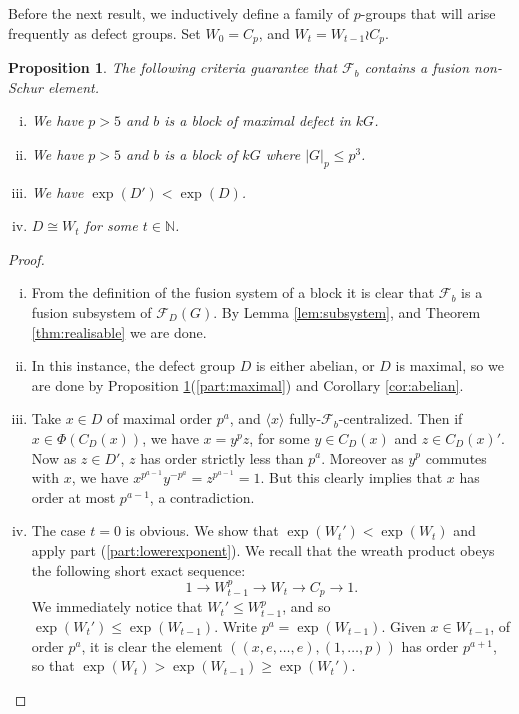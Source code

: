 \documentclass{amsart}
\theoremstyle{plain}\newtheorem{theorem}{Theorem}[section]
\theoremstyle{plain}\newtheorem{conjecture}[theorem]{Conjecture}
\theoremstyle{plain}\newtheorem{corollary}[theorem]{Corollary}
\theoremstyle{plain}\newtheorem{lemma}[theorem]{Lemma}
\theoremstyle{plain}\newtheorem{proposition}[theorem]{Proposition}
\theoremstyle{plain}\newtheorem{statement}[theorem]{}
\theoremstyle{definition}\newtheorem{definition}[theorem]{Definition}
\theoremstyle{definition}\newtheorem{example}[theorem]{Example}
\theoremstyle{definition}\newtheorem{examples}[theorem]{Examples}
\theoremstyle{definition}\newtheorem{notation}[theorem]{Notation}
\theoremstyle{definition}\newtheorem{remark}[theorem]{Remark}
\theoremstyle{definition}\newtheorem{remarks}[theorem]{Remarks}
\theoremstyle{definition}\newtheorem{question}[theorem]{Question}
\theoremstyle{definition}\newtheorem{propositiondefinition}[theorem]{Definition/Proposition}
\begin{document}
 Before the next result, we inductively define a family of $p$-groups that will arise frequently as defect groups. Set $W_{0} = C_{p}$, and $W_{t} = W_{t-1} \wr C_p$.
 \begin{proposition}\label{prop:guarantee} The following criteria guarantee that $\mathcal{F}_b$ contains a fusion non-Schur element.
	 \begin{enumerate}[(i)]
	 \item\label{part:maximal} We have $p>5$ and $b$ is a block of maximal defect in $kG$.
	 \item\label{part:lessthanp3} We have $p>5$ and $b$ is a block of $kG$ where $|G|_p \leq p^3$. 
	 \item\label{part:lowerexponent} We have $\operatorname{exp}(D') < \operatorname{exp}(D)$.
	 \item\label{part:wreathproduct} $D \cong W_{t}$ for some $t \in \mathbb{N}$. 
	\end{enumerate}
\end{proposition}
\begin{proof} 
	\begin{enumerate}[(i)]
	\item From the definition of the fusion system of a block it is clear that $\mathcal{F}_b$ is a fusion subsystem of $\mathcal{F}_D(G)$. By Lemma \ref{lem:subsystem}, and Theorem \ref{thm:realisable} we are done.
	\item In this instance, the defect group $D$ is either abelian, or $D$ is maximal, so we are done by  Proposition \ref{prop:guarantee}(\ref{part:maximal}) and Corollary \ref{cor:abelian}. 
	\item Take $x \in D$ of maximal order $p^a$, and $\langle x \rangle$ fully-$\mathcal{F}_b$-centralized. Then if $x \in \Phi(C_D(x))$, we have $x = y^p z$, for some  $y \in C_D(x)$ and $z \in C_D(x)'$. Now as $z \in D'$, $z$ has order strictly less than $p^a$. Moreover as $y^p$ commutes with $x$, we have $x^{p^{a-1}}y^{-p^a} = z^{p^{a-1}}  = 1$. But this clearly implies that $x$ has order at most $p^{a-1}$, a contradiction. 
	\item The case $t=0$ is obvious. We show that $\operatorname{exp}(W_{t}') < \operatorname{exp}(W_{t})$ and apply part (\ref{part:lowerexponent}). We recall that the wreath product obeys the following short exact sequence:
		$$ 1 \rightarrow W_{t-1}^p \rightarrow W_{t} \rightarrow C_p \rightarrow 1.$$
		We immediately notice that $W_{t}' \leq  W_{t-1}^p$, and so $\operatorname{exp}(W_{t}') \leq \operatorname{exp}(W_{t-1})$. Write $p^a = \operatorname{exp}(W_{t-1})$. Given $x \in W_{t-1}$, of order $p^a$, it is clear the element $((x, e, \ldots, e), (1,\ldots ,p))$ has order $p^{a+1}$, so that $\operatorname{exp}(W_{t}) > \operatorname{exp}(W_{t-1}) \geq \operatorname{exp}(W_{t}')$. 
\end{enumerate}
\end{proof}
\end{document}
